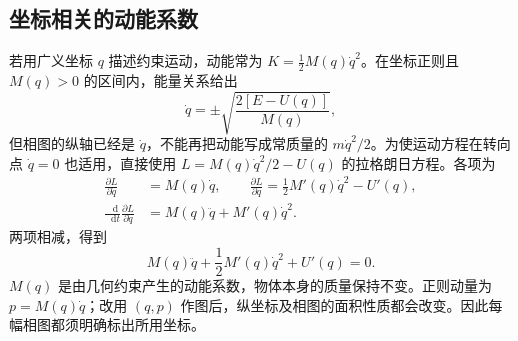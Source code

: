 \documentclass[11pt,openany,fontset=fandol]{ctexbook}
\theoremstyle{definition}\newtheorem{example}{例}[chapter]\newtheorem{exercise}{习题}[chapter]
\newcommand{\dd}{\mathop{}\!\mathrm d}\newcommand{\ee}{\mathrm e}\newcommand{\vct}[1]{\bm{#1}}
\begin{document}
\subsection{坐标相关的动能系数}
若用广义坐标 $q$ 描述约束运动，动能常为 $K=\tfrac12M(q)\dot q^2$。在坐标正则且 $M(q)>0$ 的区间内，能量关系给出
\[
\dot q=\pm\sqrt{\frac{2[E-U(q)]}{M(q)}},
\]
但相图的纵轴已经是 $\dot q$，不能再把动能写成常质量的 $m\dot q^2/2$。为使运动方程在转向点 $\dot q=0$ 也适用，直接使用 $L=M(q)\dot q^2/2-U(q)$ 的拉格朗日方程。各项为
\[
\begin{aligned}
\frac{\partial L}{\partial\dot q}&=M(q)\dot q,\qquad
\frac{\partial L}{\partial q}=\frac12M'(q)\dot q^2-U'(q),\\
\frac{\dd}{\dd t}\frac{\partial L}{\partial\dot q}
&=M(q)\ddot q+M'(q)\dot q^2.
\end{aligned}
\]
两项相减，得到
\begin{equation}\label{mp4:eq:l4-variable-mass}
M(q)\ddot q+\frac12M'(q)\dot q^2+U'(q)=0.
\end{equation}
$M(q)$ 是由几何约束产生的动能系数，物体本身的质量保持不变。正则动量为 $p=M(q)\dot q$；改用 $(q,p)$ 作图后，纵坐标及相图的面积性质都会改变。因此每幅相图都须明确标出所用坐标。
\end{document}
